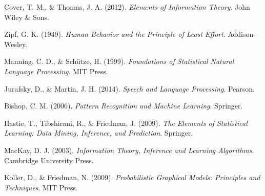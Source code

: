 \documentclass[12pt,a4paper]{article}
\begin{document}
\begin{thebibliography}{99}
Cover, T. M., \& Thomas, J. A. (2012). \textit{Elements of Information Theory}. John Wiley \& Sons.

Zipf, G. K. (1949). \textit{Human Behavior and the Principle of Least Effort}. Addison-Wesley.

Manning, C. D., \& Schütze, H. (1999). \textit{Foundations of Statistical Natural Language Processing}. MIT Press.

Jurafsky, D., \& Martin, J. H. (2014). \textit{Speech and Language Processing}. Pearson.

Bishop, C. M. (2006). \textit{Pattern Recognition and Machine Learning}. Springer.

Hastie, T., Tibshirani, R., \& Friedman, J. (2009). \textit{The Elements of Statistical Learning: Data Mining, Inference, and Prediction}. Springer.

MacKay, D. J. (2003). \textit{Information Theory, Inference and Learning Algorithms}. Cambridge University Press.

Koller, D., \& Friedman, N. (2009). \textit{Probabilistic Graphical Models: Principles and Techniques}. MIT Press.

\end{thebibliography}
\end{document}
